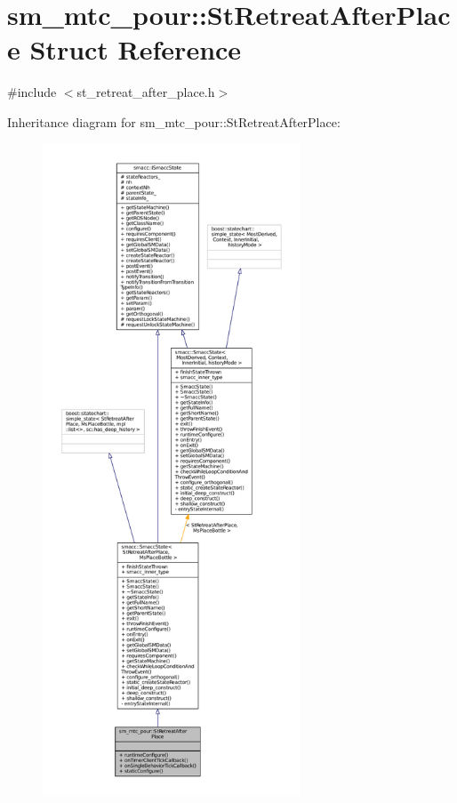 \hypertarget{structsm__mtc__pour_1_1StRetreatAfterPlace}{}\section{sm\+\_\+mtc\+\_\+pour\+:\+:St\+Retreat\+After\+Place Struct Reference}
\label{structsm__mtc__pour_1_1StRetreatAfterPlace}


{\ttfamily \#include $<$st\+\_\+retreat\+\_\+after\+\_\+place.\+h$>$}



Inheritance diagram for sm\+\_\+mtc\+\_\+pour\+:\+:St\+Retreat\+After\+Place\+:
\nopagebreak
\begin{figure}[H]
\begin{center}
\leavevmode
\includegraphics[height=550pt]{structsm__mtc__pour_1_1StRetreatAfterPlace__inherit__graph}
\end{center}
\end{figure}


